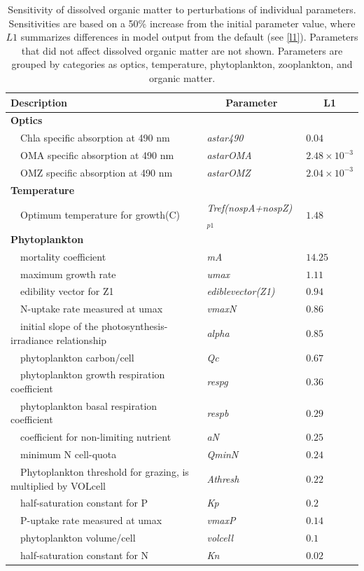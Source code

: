 \documentclass[letterpaper,12pt,oneside]{article}\usepackage[]{graphicx}\usepackage[]{color}
\begin{document}
\begin{table}[!tbp]
{\footnotesize
\caption{Sensitivity of dissolved organic matter to perturbations of individual parameters.  Sensitivities are based on a 50\% increase from the initial parameter value, where $L1$ summarizes differences in model output from the default (see \cref{l1}).  Parameters that did not affect dissolved organic matter are not shown.  Parameters are grouped by categories as optics, temperature, phytoplankton, zooplankton, and organic matter.\label{tab:om2sens}} 
\begin{center}
\begin{tabular}{lll}
\hline\hline
\multicolumn{1}{l}{Description}&\multicolumn{1}{c}{Parameter}&\multicolumn{1}{c}{L1}\tabularnewline
\hline
{\bfseries Optics}&&\tabularnewline
~~Chla specific absorption at 490 nm&\textit{astar490}&$0.04$\tabularnewline
~~OMA specific absorption at 490 nm&\textit{astarOMA}&$2.48\times 10^{-3}$\tabularnewline
~~OMZ specific absorption at 490 nm&\textit{astarOMZ}&$2.04\times 10^{-3}$\tabularnewline
\hline
{\bfseries Temperature}&&\tabularnewline
~~Optimum temperature for growth(C)&\textit{Tref(nospA+nospZ)$_{p1}$}&$1.48$\tabularnewline
\hline
{\bfseries Phytoplankton}&&\tabularnewline
~~mortality coefficient&\textit{mA}&$14.25$\tabularnewline
~~maximum growth rate&\textit{umax}&$1.11$\tabularnewline
~~edibility vector for Z1&\textit{ediblevector(Z1)}&$0.94$\tabularnewline
~~N-uptake rate measured at umax&\textit{vmaxN}&$0.86$\tabularnewline
~~initial slope of the photosynthesis-irradiance relationship&\textit{alpha}&$0.85$\tabularnewline
~~phytoplankton carbon/cell&\textit{Qc}&$0.67$\tabularnewline
~~phytoplankton growth respiration coefficient&\textit{respg}&$0.36$\tabularnewline
~~phytoplankton basal respiration coefficient&\textit{respb}&$0.29$\tabularnewline
~~coefficient for non-limiting nutrient&\textit{aN}&$0.25$\tabularnewline
~~minimum N cell-quota&\textit{QminN}&$0.24$\tabularnewline
~~Phytoplankton threshold for grazing, is multiplied by VOLcell&\textit{Athresh}&$0.22$\tabularnewline
~~half-saturation constant for P&\textit{Kp}&$0.2$\tabularnewline
~~P-uptake rate measured at umax&\textit{vmaxP}&$0.14$\tabularnewline
~~phytoplankton volume/cell&\textit{volcell}&$0.1$\tabularnewline
~~half-saturation constant for N&\textit{Kn}&$0.02$\tabularnewline

\end{tabular}
\end{center}}
\end{table}
\end{document}
